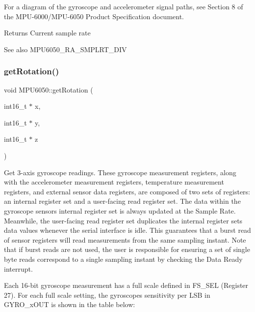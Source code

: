 For a diagram of the gyroscope and accelerometer signal paths, see Section 8 of the M\+P\+U-\/6000/\+M\+P\+U-\/6050 Product Specification document.

\begin{DoxyReturn}{Returns}
Current sample rate 
\end{DoxyReturn}
\begin{DoxySeeAlso}{See also}
M\+P\+U6050\+\_\+\+R\+A\+\_\+\+S\+M\+P\+L\+R\+T\+\_\+\+D\+IV 
\end{DoxySeeAlso}
\mbox{\label{class_m_p_u6050_a8ca85b87e7e0230921062fce7889b0d1}} 
\subsubsection{\texorpdfstring{getRotation()}{getRotation()}}
{\footnotesize\ttfamily void M\+P\+U6050\+::get\+Rotation (\begin{DoxyParamCaption}\item[{int16\+\_\+t $\ast$}]{x,  }\item[{int16\+\_\+t $\ast$}]{y,  }\item[{int16\+\_\+t $\ast$}]{z }\end{DoxyParamCaption})}

Get 3-\/axis gyroscope readings. These gyroscope measurement registers, along with the accelerometer measurement registers, temperature measurement registers, and external sensor data registers, are composed of two sets of registers\+: an internal register set and a user-\/facing read register set. The data within the gyroscope sensors\textquotesingle{} internal register set is always updated at the Sample Rate. Meanwhile, the user-\/facing read register set duplicates the internal register set\textquotesingle{}s data values whenever the serial interface is idle. This guarantees that a burst read of sensor registers will read measurements from the same sampling instant. Note that if burst reads are not used, the user is responsible for ensuring a set of single byte reads correspond to a single sampling instant by checking the Data Ready interrupt.

Each 16-\/bit gyroscope measurement has a full scale defined in F\+S\+\_\+\+S\+EL (Register 27). For each full scale setting, the gyroscopes\textquotesingle{} sensitivity per L\+SB in G\+Y\+R\+O\+\_\+x\+O\+UT is shown in the table below\+:


